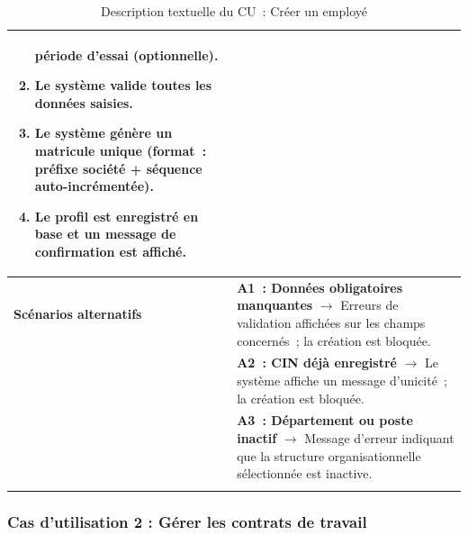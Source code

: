 \begin{xltabular}{\textwidth}{|l|X|}
\begin{enumerate}[nosep, leftmargin=*]
              période d'essai (optionnelle).
        \item Le système valide toutes les données saisies.
        \item Le système génère un matricule unique (format~: préfixe
              société + séquence auto-incrémentée).
        \item Le profil est enregistré en base et un message de
              confirmation est affiché.
    \end{enumerate} \\ \hline
    \textbf{Scénarios alternatifs}
    & \textbf{A1~: Données obligatoires manquantes} $\rightarrow$
      Erreurs de validation affichées sur les champs concernés~;
      la création est bloquée. \\ 
    & \textbf{A2~: CIN déjà enregistré} $\rightarrow$
      Le système affiche un message d'unicité~; la création est bloquée. \\ 
    & \textbf{A3~: Département ou poste inactif} $\rightarrow$
      Message d'erreur indiquant que la structure organisationnelle
      sélectionnée est inactive. \\ \hline
    \caption{Description textuelle du CU~: Créer un employé}
    \label{tab:uc_creer_employe}
\end{xltabular}
\subsubsection{Cas d'utilisation 2 : Gérer les contrats de travail}

